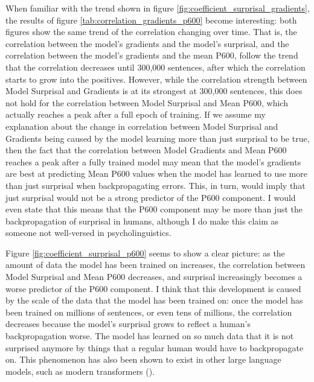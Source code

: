 \documentclass{IEEEtran}
\begin{document}
When familiar with the trend shown in figure \ref{fig:coefficient_surprisal_gradients}, the results of figure \ref{tab:correlation_gradients_p600} become interesting: both figures show the same trend of the correlation changing over time.
That is, the correlation between the model's gradients and the model's surprisal, and the correlation between the model's gradients and the mean P600, follow the trend that the correlation decreases until 300,000 sentences, after which the correlation starts to grow into the positives.
However, while the correlation strength between Model Surprisal and Gradients is at its strongest at 300,000 sentences, this does not hold for the correlation between Model Surprisal and Mean P600, which actually reaches a peak after a full epoch of training.
If we assume my explanation about the change in correlation between Model Surprisal and Gradients being caused by the model learning more than just surprisal to be true, then the fact that the correlation between Model Gradients and Mean P600 reaches a peak after a fully trained model may mean that the model's gradients are best at predicting Mean P600 values when the model has learned to use more than just surprisal when backpropagating errors.
This, in turn, would imply that just surprisal would not be a strong predictor of the P600 component.
I would even state that this means that the P600 component may be more than just the backpropagation of surprisal in humans, although I do make this claim as someone not well-versed in psycholinguistics.

Figure \ref{fig:coefficient_surprisal_p600} seems to show a clear picture: as the amount of data the model has been trained on increases, the correlation between Model Surprisal and Mean P600 decreases, and surprisal increasingly becomes a worse predictor of the P600 component.
I think that this development is caused by the scale of the data that the model has been trained on: once the model has been trained on millions of sentences, or even tens of millions, the correlation decreases because the model's surprisal grows to reflect a human's backpropagation worse.
The model has learned on so much data that it is not surprised anymore by things that a regular human would have to backpropagate on.
This phenomenon has also been shown to exist in other large language models, such as modern transformers (\cite{oh2023why}).
\end{document}
